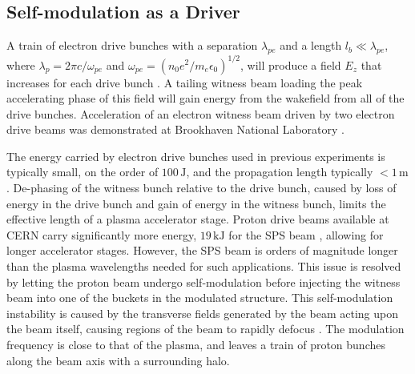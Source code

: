 \documentclass[aps,prstab,reprint,amsmath,amssymb,groupedaddress]{revtex4-1}
\newcommand{\unit}[1]{\,\mathrm{#1}}
\begin{document}
\subsection[\label{S:I:SMI}]{Self-modulation as a Driver}

A train of electron drive bunches with a separation $\lambda_{pe}$ and a length $l_{b} \ll \lambda_{pe}$, where
$\lambda_{p} = 2\pi c/\omega_{pe}$ and $\omega_{pe} = (n_{0} e^{2} / m_{e} \epsilon_{0})^{1/2}$,
will produce a field $E_{z}$ that increases for each drive bunch \cite{chen:1985}. A tailing witness beam loading the
peak accelerating phase of this field will gain energy from the wakefield from all of the drive bunches. Acceleration of
an electron witness beam driven by two electron drive beams was demonstrated at Brookhaven National Laboratory
\cite{muggli:2011}.

The energy carried by electron drive bunches used in previous experiments is typically small, on the order of
$100\unit{J}$, and the propagation length typically $<1\unit{m}$ \cite{blumenfeld:2007,caldwell:2009}. De-phasing of the
witness bunch relative to the drive bunch, caused by loss of energy in the drive bunch and gain of energy in the witness
bunch, limits the effective length of a plasma accelerator stage. Proton drive beams available at CERN carry
significantly more energy, $19\unit{kJ}$ for the SPS beam \cite{gschwendtner:2016}, allowing for longer accelerator
stages. However, the SPS beam is orders of magnitude longer than the plasma wavelengths needed for such applications.
This issue is resolved by letting the proton beam undergo self-modulation before injecting the witness beam into one of
the buckets in the modulated structure. This self-modulation instability is caused by the transverse fields generated by
the beam acting upon the beam itself, causing regions of the beam to rapidly defocus \cite{kumar:2010}. The modulation
frequency is close to that of the plasma, and leaves a train of proton bunches along the beam axis with a surrounding
halo.
\end{document}
